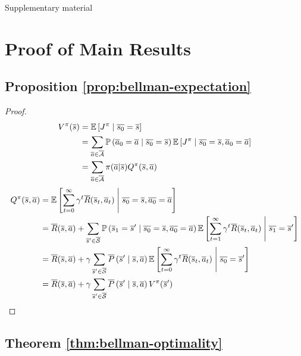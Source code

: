 % 

\begin{center}
\LARGE Supplementary material
\end{center}
\appendix

\section{Proof of Main Results}
\subsection{Proposition \ref{prop:bellman-expectation}}

\begin{proof}
\begin{align*}
    V^\pi(\os) &= \expectedvalue\left[ J^\pi \condbar \ov{s_0} = \os\right] \\
    &=\sum_{\oa\in\ocA} \probability{\oa_0 = \oa \condbar\ov{s_0} = \os} \expectedvalue\left[ J^\pi \condbar \ov{s_0} = \os, \oa_0 = \oa\right]\\
    &= \sum_{\oa\in\ocA} \pi(\oa | \os) Q^\pi(\os,\oa)
\end{align*}
\begin{align*}
    Q^\pi(\os, \oa) &= \expectedvalue\left[\sum_{t=0}^\infty \gamma^t \ov{R}(\os_t, \oa_t)\condbar \ov{s_0} = \os, \ov{a_0} = \oa\right] \\
    &= \ov{R}(\os, \oa) + \sum_{\os'\in\ocS}\probability{\os_1 = \os' \condbar\ov{s_0} = \os, \ov{a_0} = \oa}\expectedvalue\left[\sum_{t=1}^\infty \gamma^t \ov{R}(\os_t, \oa_t)\condbar \ov{s_1} = \os'\right] \\
    &= \ov{R}(\os, \oa) + \gamma\sum_{\os'\in\ocS}\ov{P}\left(\os' \condbar\os, \oa\right) \expectedvalue\left[\sum_{t=0}^\infty \gamma^t \ov{R}(\os_t, \oa_t) \condbar \ov{s_0} = \os'\right] \\
    &=  \ov{R}(\os, \oa) + \gamma\sum_{\os'\in\ocS}\ov{P}\left(\os' \condbar\os, \oa\right) V^\pi(\os')
\end{align*}
\end{proof}

\subsection{Theorem \ref{thm:bellman-optimality}}

